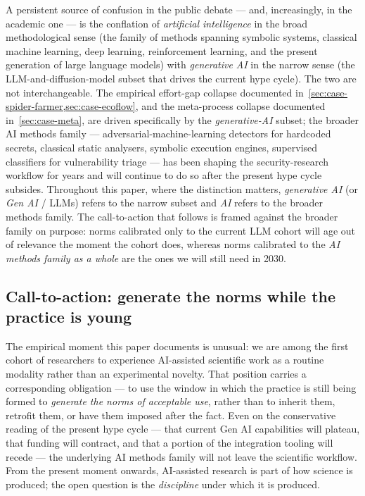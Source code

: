 \documentclass[11pt,a4paper]{article}
\begin{document}
A persistent source of confusion in the public debate --- and,
increasingly, in the academic one --- is the conflation of
\emph{artificial intelligence} in the broad methodological sense (the
family of methods spanning symbolic systems, classical machine learning,
deep learning, reinforcement learning, and the present generation of
large language models) with \emph{generative AI} in the narrow sense
(the LLM-and-diffusion-model subset that drives the current hype cycle).
The two are not interchangeable. The empirical effort-gap collapse
documented in~\cref{sec:case-spider-farmer,sec:case-ecoflow}, and the
meta-process collapse documented in~\cref{sec:case-meta}, are driven
specifically by the \emph{generative-AI} subset; the broader AI methods
family --- adversarial-machine-learning detectors for hardcoded secrets,
classical static analysers, symbolic execution engines, supervised
classifiers for vulnerability triage --- has been shaping the
security-research workflow for years and will continue to do so after
the present hype cycle subsides. Throughout this paper, where the
distinction matters, \emph{generative AI} (or \emph{Gen AI} / LLMs)
refers to the narrow subset and \emph{AI} refers to the broader methods
family. The call-to-action that follows is framed against the broader
family on purpose: norms calibrated only to the current LLM cohort will
age out of relevance the moment the cohort does, whereas norms
calibrated to the \emph{AI methods family as a whole} are the ones we
will still need in 2030.

\subsection{Call-to-action: generate the norms while the practice is young}
\label{sec:call-to-action}

The empirical moment this paper documents is unusual: we are among the
first cohort of researchers to experience AI-assisted scientific work as
a routine modality rather than an experimental novelty. That position
carries a corresponding obligation --- to use the window in which the
practice is still being formed to \emph{generate the norms of acceptable
use}, rather than to inherit them, retrofit them, or have them imposed
after the fact. Even on the conservative reading of the present hype
cycle --- that current Gen AI capabilities will plateau, that funding
will contract, and that a portion of the integration tooling will recede
--- the underlying AI methods family will not leave the scientific
workflow. From the present moment onwards, AI-assisted research is part
of how science is produced; the open question is the \emph{discipline}
under which it is produced.
\end{document}
